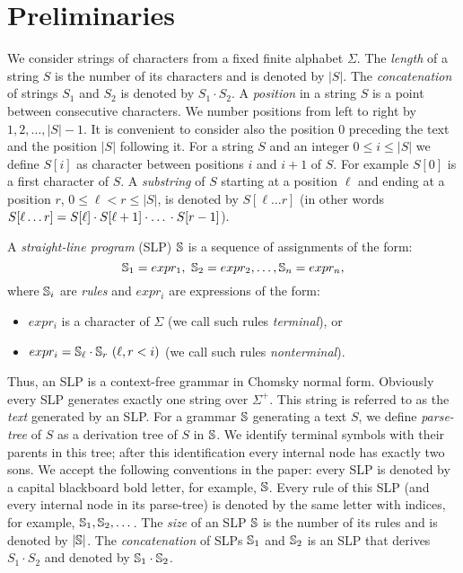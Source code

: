 ﻿\documentclass[10pt, conference, compsocconf]{IEEEtran}
\begin{document}
\section{Preliminaries}

We consider strings of characters from a fixed finite alphabet $\Sigma$. The \emph{length} of a string
$S$ is the number of its characters and is denoted by $|S|$. The \emph{concatenation} of strings $S_1$ and $S_2$
is denoted by $S_1 \cdot S_2$. A \emph{position} in a string $S$ is a point between consecutive characters. We number
positions from left to right by $1,2,\dots,|S|-1$. It is convenient to consider also the position 0 preceding the text
and the position $|S|$ following it. For a string $S$ and an integer $0 \leq i \leq |S|$ we define $S[i]$ as character
between positions $i$ and $i+1$ of $S$. For example $S[0]$ is a first character of $S$. A \emph{substring} of $S$
starting at a position $\ell$ and ending at a position $r$, $0\leq \ell < r \leq |S|$, is denoted by $S[\ell \dots r]$ (in other
words $S[\ell \dots r] = S[\ell] \cdot S[\ell + 1] \cdot \mbox{\dots} \cdot S[r-1]$).

A \emph{straight-line program} (SLP) $\mathbb{S}$ is a sequence of assignments of
the form: $$\mathbb{S}_1 = expr_1,\ \mathbb{S}_2 = expr_2, \dots, \mathbb{S}_n =
expr_n,$$ where $\mathbb{S}_i$ are \emph{rules} and $expr_i$ are expressions of
the form:
\begin{itemize}
\item $expr_i$ is a character of $\Sigma$ (we call such rules \emph{terminal}), or
\item $expr_i = \slp{S}_\ell\cdot \slp{S}_r \ (\ell, r < i)$ (we call such rules \emph{nonterminal}).
\end{itemize}

Thus, an SLP is a context-free grammar in Chomsky normal form. Obviously every SLP generates exactly one string over
$\Sigma^+$. This string is referred to as the \emph{text} generated by an SLP. For a grammar $\mathbb{S}$ generating a text
$S$, we define \emph{parse-tree} of $S$ as a derivation tree of $S$ in $\mathbb{S}$. We identify terminal symbols with
their parents in this tree; after this identification every internal node has exactly two sons. We accept the
following conventions in the paper: every SLP is denoted by a capital blackboard bold letter, for example, $\mathbb{S}$.
Every rule of this SLP (and every internal node in its parse-tree) is denoted by the same letter with indices, for
example, $\mathbb{S}_1,\mathbb{S}_2,\dots$. The \emph{size} of an SLP $\mathbb{S}$ is the number of its rules and is denoted by
$|\mathbb{S}|$. The \emph{concatenation} of SLPs $\mathbb{S}_1$ and $\mathbb{S}_2$ is an SLP that derives
$S_1 \cdot S_2$ and denoted by $\mathbb{S}_1 \cdot \mathbb{S}_2$.
\end{document}
